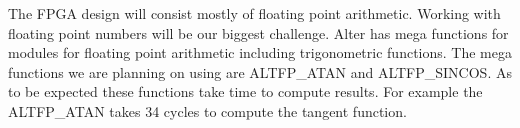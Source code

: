 The FPGA design will consist mostly of floating point arithmetic. Working 
with floating point numbers will be our biggest challenge. Alter has 
mega functions for modules for floating point arithmetic including 
trigonometric functions. The mega functions we are planning on using 
are ALTFP_ATAN and ALTFP_SINCOS. As to be expected these functions take 
time to compute results. For example the ALTFP_ATAN takes 34 cycles to 
compute the tangent function. 

